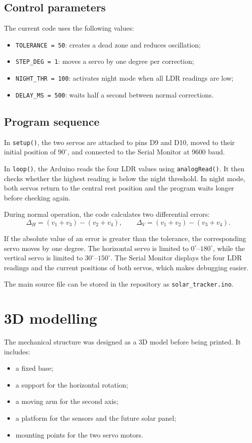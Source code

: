 \documentclass[10pt,a4paper]{article}
\begin{document}
\subsection{Control parameters}

The current code uses the following values:
\begin{itemize}
  \item \texttt{TOLERANCE = 50}: creates a dead zone and reduces oscillation;
  \item \texttt{STEP\_DEG = 1}: moves a servo by one degree per correction;
  \item \texttt{NIGHT\_THR = 100}: activates night mode when all LDR readings are low;
  \item \texttt{DELAY\_MS = 500}: waits half a second between normal corrections.
\end{itemize}

\subsection{Program sequence}

In \texttt{setup()}, the two servos are attached to pins D9 and D10, moved to their initial position of $90^\circ$, and connected to the Serial Monitor at 9600 baud.

In \texttt{loop()}, the Arduino reads the four LDR values using \texttt{analogRead()}. It then checks whether the highest reading is below the night threshold. In night mode, both servos return to the central rest position and the program waits longer before checking again.

During normal operation, the code calculates two differential errors:
\[
\Delta_H=(v_1+v_3)-(v_2+v_4),\qquad
\Delta_V=(v_1+v_2)-(v_3+v_4).
\]

If the absolute value of an error is greater than the tolerance, the corresponding servo moves by one degree. The horizontal servo is limited to $0^\circ$--$180^\circ$, while the vertical servo is limited to $30^\circ$--$150^\circ$. The Serial Monitor displays the four LDR readings and the current positions of both servos, which makes debugging easier.

The main source file can be stored in the repository as \texttt{solar\_tracker.ino}.

\section{3D modelling}

The mechanical structure was designed as a 3D model before being printed. It includes:
\begin{itemize}
  \item a fixed base;
  \item a support for the horizontal rotation;
  \item a moving arm for the second axis;
  \item a platform for the sensors and the future solar panel;
  \item mounting points for the two servo motors.
\end{itemize}
\end{document}
